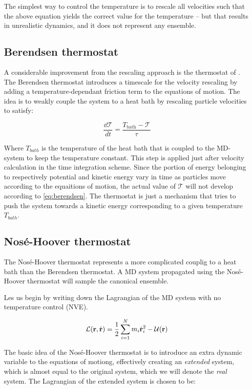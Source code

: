 The simplest way to control the temperature is to rescale all velocities such that the above equation yields the correct value for the temperature -- but that results in unrealistic dynamics, and it does not represent any ensemble.

\subsection{Berendsen thermostat}
A considerable improvement from the rescaling approach is the thermostat of \citet{Berendsen1984}. The Berendsen thermostat introduces a timescale for the velocity rescaling by adding a temperature-dependant friction term to the equations of motion. The idea is to weakly couple the system to a heat bath by rescaling particle velocities to satisfy:

\begin{equation}
\frac{\dd \mathcal{T}}{dt} = \frac{T_{\text{bath}}-\mathcal{T}}{\tau}
\label{eq:berendsen}
\end{equation}

Where $T_{bath}$ is the temperature of the heat bath that is coupled to the MD-system to keep the temperature constant. This step is applied just after velocity calculation in the time integration scheme. Since the portion of energy belonging to respectively potential and kinetic energy vary in time as particles move according to the equaitions of motion, the actual value of $\mathcal{T}$ will not develop according to \ref{eq:berendsen}. The thermostat is just a mechanism that tries to push the system towards a kinetic energy corresponding to a given temperature $T_{bath}$.

\subsection{Nosé-Hoover thermostat}
The Nosé-Hoover thermostat represents a more complicated couplig to a heat bath than the Berendsen thermostat. A MD system propagated using the Nosé-Hoover thermostat will sample the canonical ensemble. 

Les us begin by writing down the Lagrangian of the MD system with no temperature control (NVE).

\begin{equation}
	\mathcal{L}(\mathbf{r}, \dot{\mathbf{r}}) = \frac{1}{2} \sum_{i=1}^N m_i \dot{\mathbf{r}}_i^2 - \mathcal{U(\mathbf{r})}
\end{equation}

The basic idea of the Nosé-Hoover thermostat is to introduce an extra dynamic variable to the equations of motiong, effectively creating an \emph{extended} system, which is almost equal to the original system, which we will denote the \emph{real} system. The Lagrangian of the extended system is chosen to be:



